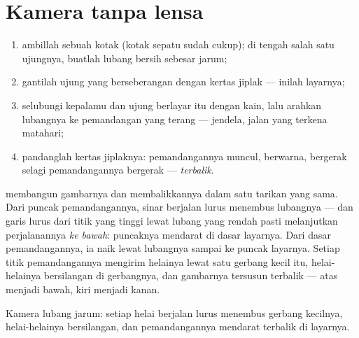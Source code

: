 \section{Kamera tanpa lensa}

\begin{method}\label{met:g6:light-propagation:pinhole}
\begin{enumerate}
  \item ambillah sebuah kotak (kotak sepatu sudah cukup); di tengah
        salah satu ujungnya, buatlah lubang bersih sebesar jarum;
  \item gantilah ujung yang berseberangan dengan kertas jiplak ---
        inilah layarnya;
  \item selubungi kepalamu dan ujung berlayar itu dengan kain, lalu
        arahkan lubangnya ke pemandangan yang terang --- jendela,
        jalan yang terkena matahari;
  \item pandanglah kertas jiplaknya: pemandangannya muncul,
        berwarna, bergerak selagi pemandangannya bergerak ---
        \emph{terbalik}.
\end{enumerate}
\end{method}

\begin{proposition}\label{prop:g6:light-propagation:inverted}
 membangun gambarnya dan membalikkannya dalam satu
tarikan yang sama. Dari puncak pemandangannya, sinar berjalan lurus
menembus lubangnya --- dan garis lurus dari titik yang tinggi lewat
lubang yang rendah pasti melanjutkan perjalanannya \emph{ke bawah}:
puncaknya mendarat di dasar layarnya. Dari dasar pemandangannya, ia
naik lewat lubangnya sampai ke puncak layarnya. Setiap titik
pemandangannya mengirim helainya lewat satu gerbang kecil itu,
helai-helainya bersilangan di gerbangnya, dan gambarnya tersusun
terbalik --- atas menjadi bawah, kiri menjadi kanan.
\end{proposition}

\begin{omfigure}

{\small Kamera lubang jarum: setiap helai  berjalan lurus
menembus gerbang kecilnya, helai-helainya bersilangan, dan
pemandangannya mendarat terbalik di layarnya.}
\end{omfigure}

